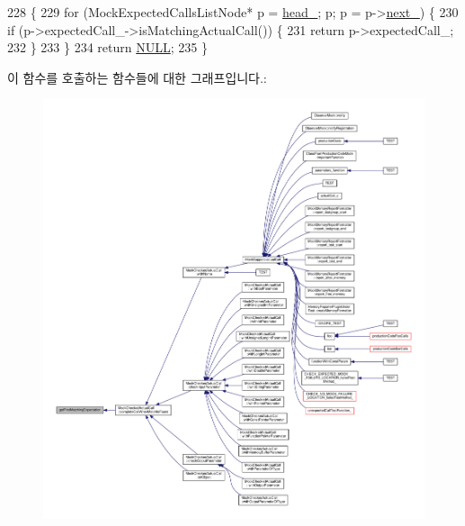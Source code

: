 \begin{DoxyCode}
228 \{
229     \textcolor{keywordflow}{for} (MockExpectedCallsListNode* p = \hyperlink{class_mock_expected_calls_list_a18290c3c0a206882dd8e0d9f446e2fe6}{head\_}; p; p = p->\hyperlink{class_mock_expected_calls_list_1_1_mock_expected_calls_list_node_aaae452a372ae14c06a6d5d252df73725}{next\_}) \{
230         \textcolor{keywordflow}{if} (p->expectedCall\_->isMatchingActualCall()) \{
231             \textcolor{keywordflow}{return} p->expectedCall\_;
232         \}
233     \}
234     \textcolor{keywordflow}{return} \hyperlink{openavb__types__base__pub_8h_a070d2ce7b6bb7e5c05602aa8c308d0c4}{NULL};
235 \}
\end{DoxyCode}


이 함수를 호출하는 함수들에 대한 그래프입니다.\+:
\nopagebreak
\begin{figure}[H]
\begin{center}
\leavevmode
\includegraphics[width=350pt]{class_mock_expected_calls_list_ab6c35f9ece49ce41eae2d46ed7b94a1d_icgraph}
\end{center}
\end{figure}


